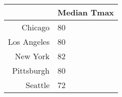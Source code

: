 \begin{table}[ht]
\centering
\begin{tabular}{rl}
  \hline
 & Median Tmax \\ 
  \hline
Chicago & 80 \\ 
  Los Angeles & 80 \\ 
  New York & 82 \\ 
  Pittsburgh & 80 \\ 
  Seattle & 72 \\ 
   \hline
\end{tabular}
\end{table}
